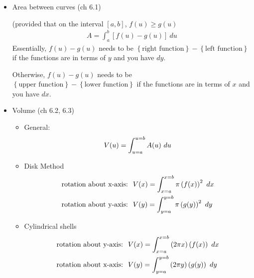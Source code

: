 \documentclass{report}
\begin{document}
\setlength{\columnsep}{3cm}
\begin{multicols}{2}
\setlength{\columnseprule}{.4pt}

\begin{itemize}[leftmargin=.25cm]
\item Area between curves (ch 6.1)

(provided that on the interval $[a,b]$, $ f(u) \geq g(u) $
\begin{align*}
A = \int_a^b [ f(u) - g(u) ] \ du
\end{align*}
Essentially, $ f(u) - g(u) $ needs to be $ \left\{ \textrm{right function} \right\} - \left\{ \textrm{left function} \right\} $ if the functions are in terms of $ y $ and you have $ dy $.

Otherwise, $ f(u) - g(u) $ needs to be $ \left\{ \textrm{upper function} \right\} - \left\{ \textrm{lower function} \right\} $ if the functions are in terms of $ x $ and you have $ dx $.




\item Volume (ch 6.2, 6.3)
\begin{itemize}[leftmargin=.25cm]
\item General:
\begin{align*} 
V(u) = \int_{u=a}^{u=b} A(u) \ du \hfill \\
\end{align*}

\item Disk Method
\begin{align*}
&\textrm{rotation about x-axis:} \hspace{0.25cm} V(x) = \int_{x=a}^{x=b} \pi \left( f(x) \right)^2 \ dx \hfill \\
&\textrm{rotation about y-axis:} \hspace{0.25cm} V(y) = \int_{y=a}^{y=b} \pi \left( g(y) \right)^2 \ dy \hfill \\
\end{align*}

\item Cylindrical shells
\begin{align*}
&\textrm{rotation about y-axis:} \hspace{0.25cm} V(x) = \int_{x=a}^{x=b} \left( 2 \pi x \right) \left( f(x) \right) \ dx \\
&\textrm{rotation about x-axis:} \hspace{0.25cm} V(y) = \int_{y=a}^{y=b} \left( 2 \pi y \right) \left( g(y) \right) \ dy
\end{align*}
\end{itemize}





\end{itemize}
\end{multicols}
\end{document}
